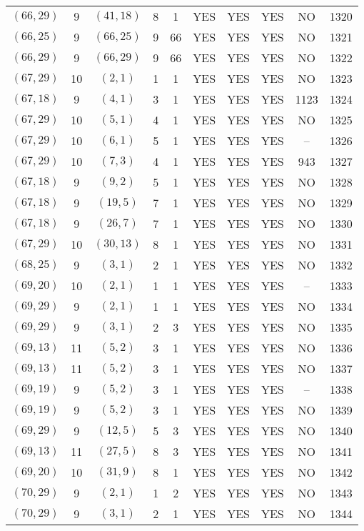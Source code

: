 \begin{longtable}{|c|c|c|c|c|c|c|c|c|c|}
$(66, 29)$ & 9 & $(41, 18)$ & 8 & 1 & YES & YES & YES & NO & 1320\\
$(66, 25)$ & 9 & $(66, 25)$ & 9 & 66 & YES & YES & YES & NO & 1321\\
$(66, 29)$ & 9 & $(66, 29)$ & 9 & 66 & YES & YES & YES & NO & 1322\\
$(67, 29)$ & 10 & $(2, 1)$ & 1 & 1 & YES & YES & YES & NO & 1323\\
$(67, 18)$ & 9 & $(4, 1)$ & 3 & 1 & YES & YES & YES & 1123 & 1324\\
$(67, 29)$ & 10 & $(5, 1)$ & 4 & 1 & YES & YES & YES & NO & 1325\\
$(67, 29)$ & 10 & $(6, 1)$ & 5 & 1 & YES & YES & YES & -- & 1326\\
$(67, 29)$ & 10 & $(7, 3)$ & 4 & 1 & YES & YES & YES & 943 & 1327\\
$(67, 18)$ & 9 & $(9, 2)$ & 5 & 1 & YES & YES & YES & NO & 1328\\
$(67, 18)$ & 9 & $(19, 5)$ & 7 & 1 & YES & YES & YES & NO & 1329\\
$(67, 18)$ & 9 & $(26, 7)$ & 7 & 1 & YES & YES & YES & NO & 1330\\
$(67, 29)$ & 10 & $(30, 13)$ & 8 & 1 & YES & YES & YES & NO & 1331\\
$(68, 25)$ & 9 & $(3, 1)$ & 2 & 1 & YES & YES & YES & NO & 1332\\
$(69, 20)$ & 10 & $(2, 1)$ & 1 & 1 & YES & YES & YES & -- & 1333\\
$(69, 29)$ & 9 & $(2, 1)$ & 1 & 1 & YES & YES & YES & NO & 1334\\
$(69, 29)$ & 9 & $(3, 1)$ & 2 & 3 & YES & YES & YES & NO & 1335\\
$(69, 13)$ & 11 & $(5, 2)$ & 3 & 1 & YES & YES & YES & NO & 1336\\
$(69, 13)$ & 11 & $(5, 2)$ & 3 & 1 & YES & YES & YES & NO & 1337\\
$(69, 19)$ & 9 & $(5, 2)$ & 3 & 1 & YES & YES & YES & -- & 1338\\
$(69, 19)$ & 9 & $(5, 2)$ & 3 & 1 & YES & YES & YES & NO & 1339\\
$(69, 29)$ & 9 & $(12, 5)$ & 5 & 3 & YES & YES & YES & NO & 1340\\
$(69, 13)$ & 11 & $(27, 5)$ & 8 & 3 & YES & YES & YES & NO & 1341\\
$(69, 20)$ & 10 & $(31, 9)$ & 8 & 1 & YES & YES & YES & NO & 1342\\
$(70, 29)$ & 9 & $(2, 1)$ & 1 & 2 & YES & YES & YES & NO & 1343\\
$(70, 29)$ & 9 & $(3, 1)$ & 2 & 1 & YES & YES & YES & NO & 1344\\

\end{longtable}
